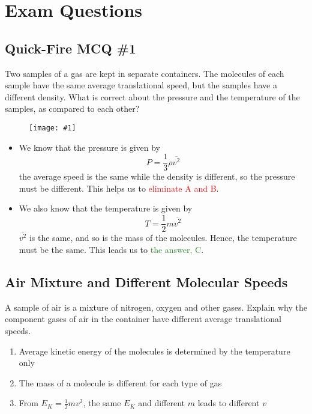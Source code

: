\documentclass[a4paper,12pt]{article}
\let\oldsection\section
\renewcommand\section{\clearpage\oldsection}
\newcommand{\img}[4]{\begin{center}
  \begin{figure}[H]
    \centering
    \texttt{[image: \#1]}
    \caption{#3}
    \label{fig:#4}
  \end{figure}
\end{center}}
\begin{document}
\pagebreak

\section{Exam Questions}

\subsection{Quick-Fire MCQ \#1}

Two samples of a gas are kept in separate containers. The molecules of each sample have the same average translational speed, but the samples have a different density.
What is correct about the pressure and the temperature of the samples, as compared to each other?

\img{ex/1.png}{0.5}{}{quickfire1}

\begin{itemize}
  \item We know that the pressure is given by $$P = \frac{1}{3}\rho\overline{v^2}$$
        the average speed is the same while the density is different, so the pressure must be different. This helps us to \textcolor{red}{eliminate A and B}.
  \item We also know that the temperature is given by $$T = \frac{1}{2}m\overline{v^2}$$
        $\overline{v^2}$ is the same, and so is the mass of the molecules. Hence, the temperature must be the same. This leads us to \textcolor{ForestGreen}{the answer, C}.
\end{itemize}

\pagebreak

\subsection{Air Mixture and Different Molecular Speeds}

A sample of air is a mixture of nitrogen, oxygen and other gases. Explain why the component gases of air in the container have different average translational speeds.
\begin{enumerate}
  \item Average kinetic energy of the molecules is determined by the temperature only
  \item The mass of a molecule is different for each type of gas
  \item From $E_K = \frac{1}{2}mv^2$, the same $E_K$ and different $m$ leads to different $v$
\end{enumerate}
\end{document}
